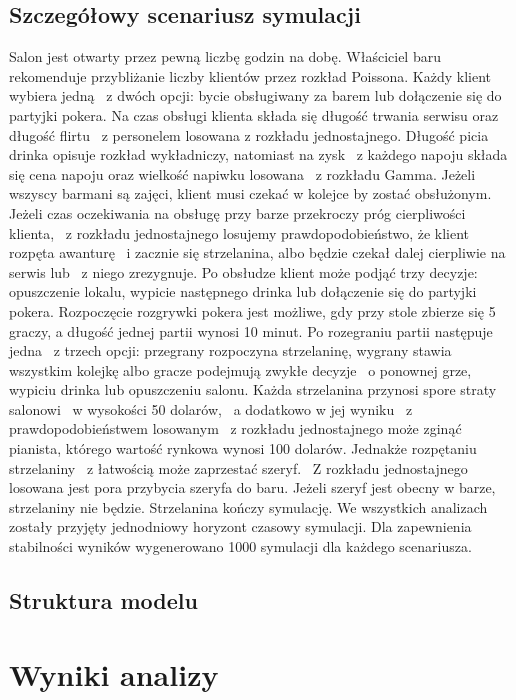 \documentclass[12pt, a4paper, oneside]{mwart} %
\begin{document}
\subsection{Szczegółowy scenariusz symulacji}
Salon jest otwarty przez pewną liczbę godzin na dobę. Właściciel baru rekomenduje przybliżanie liczby klientów przez rozkład Poissona. Każdy klient wybiera jedną ~z dwóch opcji: bycie obsługiwany za barem lub dołączenie się do partyjki pokera. Na czas obsługi klienta składa się długość trwania serwisu oraz długość flirtu ~z personelem losowana z rozkładu jednostajnego. Długość picia drinka opisuje rozkład wykładniczy, natomiast na zysk ~z każdego napoju składa się cena napoju oraz wielkość napiwku losowana ~z rozkładu Gamma. Jeżeli wszyscy barmani są zajęci, klient musi czekać w kolejce by zostać obsłużonym. Jeżeli czas oczekiwania na obsługę przy barze przekroczy próg cierpliwości klienta, ~z rozkładu jednostajnego losujemy prawdopodobieństwo, że klient rozpęta awanturę ~i zacznie się strzelanina, albo będzie czekał dalej cierpliwie na serwis lub ~z niego zrezygnuje. Po obsłudze klient może podjąć trzy decyzje: opuszczenie lokalu, wypicie następnego drinka lub dołączenie się do partyjki pokera. Rozpoczęcie rozgrywki pokera jest możliwe, gdy przy stole zbierze się 5 graczy, a długość jednej partii wynosi 10 minut. Po rozegraniu partii następuje jedna ~z trzech opcji: przegrany rozpoczyna strzelaninę, wygrany stawia wszystkim kolejkę albo gracze podejmują zwykłe decyzje ~o ponownej grze, wypiciu drinka lub opuszczeniu salonu. Każda strzelanina przynosi spore straty salonowi ~w wysokości 50 dolarów, ~a dodatkowo w jej wyniku ~z prawdopodobieństwem losowanym ~z rozkładu jednostajnego może zginąć pianista, którego wartość rynkowa wynosi 100 dolarów. Jednakże rozpętaniu strzelaniny ~z łatwością może zaprzestać szeryf. ~Z rozkładu jednostajnego losowana jest pora przybycia szeryfa do baru. Jeżeli szeryf jest obecny w barze, strzelaniny nie będzie. Strzelanina kończy symulację. We wszystkich analizach zostały przyjęty jednodniowy horyzont czasowy symulacji. Dla zapewnienia stabilności wyników wygenerowano 1000 symulacji dla każdego scenariusza.

\subsection{Struktura modelu}

\section{Wyniki analizy}
\end{document}
